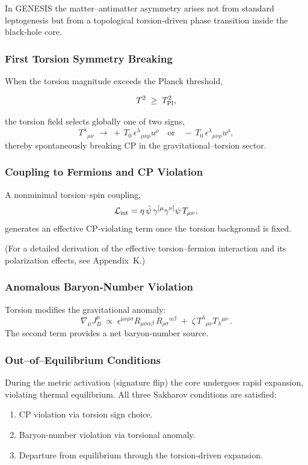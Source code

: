 \documentclass{article}
\begin{document}
In GENESIS the matter–antimatter asymmetry arises not from standard
leptogenesis but from a topological torsion‐driven phase transition inside the
black‐hole core.

\subsubsection{ First Torsion Symmetry Breaking}
When the torsion magnitude exceeds the Planck threshold,

\begin{equation}
  T^2 \;\ge\; T_{\rm Pl}^2,
\end{equation}

the torsion field selects globally one of two signs,
\begin{equation}\label{eq:auto166}
T^{\lambda}{}_{\mu\nu}
  \;\to\;
    +\,T_0\,\epsilon^{\lambda}{}_{\mu\nu\rho}u^\rho
  \quad\text{or}\quad
    -\,T_0\,\epsilon^{\lambda}{}_{\mu\nu\rho}u^\rho,
\end{equation}
thereby spontaneously breaking CP in the gravitational–torsion sector.

\subsubsection{ Coupling to Fermions and CP Violation}
A nonminimal torsion–spin coupling,
\begin{equation}\label{eq:auto167}
\mathcal{L}_{\rm int}
  = \eta\,\bar\psi\,\gamma^{[\mu}\gamma^{\nu]}\psi\,T_{\mu\nu},
\end{equation}
generates an effective CP‐violating term once the torsion background is fixed.

(For a detailed derivation of the effective torsion–fermion interaction and its polarization effects, see Appendix~K.)


\subsubsection{ Anomalous Baryon‐Number Violation}
Torsion modifies the gravitational anomaly:
\begin{equation}\label{eq:auto168}
\nabla_\mu J_B^\mu
  \;\propto\;
    \epsilon^{\mu\nu\rho\sigma}
      R_{\mu\nu\alpha\beta}\,R_{\rho\sigma}{}^{\alpha\beta}
    \;+\;\zeta\,T^{\lambda}{}_{\mu\nu}T_{\lambda}{}^{\mu\nu}\,.
\end{equation}
The second term provides a net baryon‐number source.

\subsubsection{ Out–of–Equilibrium Conditions}
During the metric activation (signature flip) the core undergoes rapid expansion,
violating thermal equilibrium.  All three Sakharov conditions are satisfied:
\begin{enumerate}
  \item CP violation via torsion sign choice.
  \item Baryon‐number violation via torsional anomaly.
  \item Departure from equilibrium through the torsion‐driven expansion.
\end{enumerate}
\end{document}
